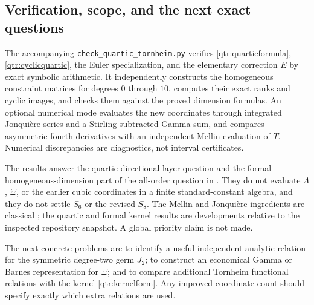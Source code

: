 \subsection{Verification, scope, and the next exact questions}

The accompanying \texttt{check\_quartic\_tornheim.py} verifies
\eqref{qtr:quarticformula}, \eqref{qtr:cyclicquartic},
the Euler specialization, and the elementary correction \(E\)
by exact symbolic arithmetic. It independently constructs the
homogeneous constraint matrices for degrees \(0\) through \(10\),
computes their exact ranks and cyclic images, and checks them
against the proved dimension formulas.
An optional numerical mode evaluates the new coordinates
through integrated Jonqui\`ere series and a Stirling-subtracted
Gamma sum, and compares asymmetric fourth derivatives with
an independent Mellin evaluation of \(T\). Numerical
discrepancies are diagnostics, not interval certificates.

The results answer the quartic directional-layer question and
the formal homogeneous-dimension part of the all-order
question in \cite{qtr:Independent}. They do not evaluate
\(\Lambda\), \(\Xi\), or the earlier cubic coordinates in
a finite standard-constant algebra, and they do not settle
\(S_6\) or the revised \(S_8\).
The Mellin and Jonqui\`ere ingredients are classical
\cite{DLMF}; the quartic and formal kernel results are
developments relative to the inspected repository snapshot.
A global priority claim is not made.

The next concrete problems are to identify a useful
independent analytic relation for the symmetric degree-two
germ \(J_2\); to construct an economical Gamma or Barnes
representation for \(\Xi\); and to compare additional
Tornheim functional relations with the kernel
\eqref{qtr:kernelform}. Any improved coordinate count should
specify exactly which extra relations are used.
